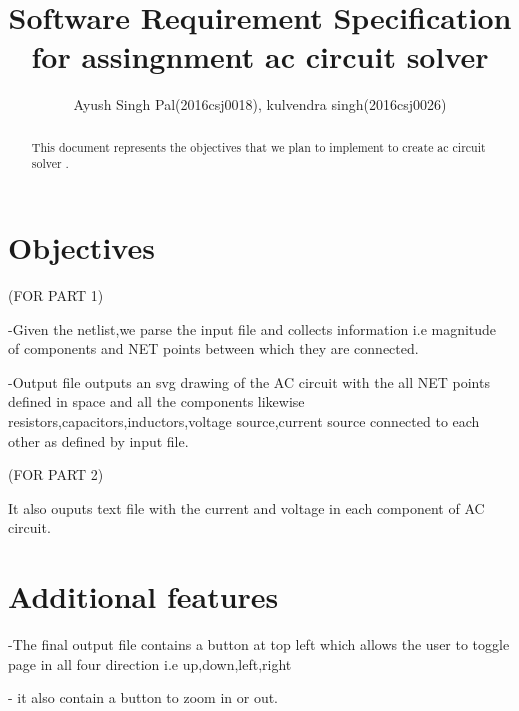 \documentclass[]{article}
\begin{document}
\title{Software Requirement Specification for assingnment ac circuit solver}
\author{Ayush Singh Pal(2016csj0018),
kulvendra singh(2016csj0026)}
\maketitle

\begin{abstract}
This document represents the objectives that we plan to implement to create ac circuit solver .
\end{abstract}

\section{Objectives }

  (FOR PART 1)


-Given the netlist,we parse the input file and collects information i.e       magnitude of components and NET points between which they are connected. 


-Output file outputs an svg drawing of the AC circuit with the all NET points defined in space and all the components likewise resistors,capacitors,inductors,voltage source,current source connected to each other as defined by input file. 

(FOR PART 2)


It also ouputs text file with  the current and voltage in each component of  AC circuit. 

\section{Additional features }

-The final output file contains a button at top left which allows the user
 to toggle page in all four direction i.e up,down,left,right
 
 - it also contain a button to zoom in or out.


	
\end{document}
